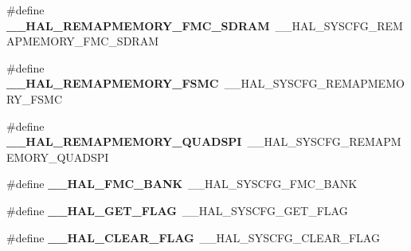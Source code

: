 \begin{DoxyCompactItemize}
\item 
\mbox{\label{group___h_a_l___aliased___macros_ga366da658d4d21e3b2192803ffc1a15f9}} 
\#define {\bfseries \+\_\+\+\_\+\+H\+A\+L\+\_\+\+R\+E\+M\+A\+P\+M\+E\+M\+O\+R\+Y\+\_\+\+F\+M\+C\+\_\+\+S\+D\+R\+AM}~\+\_\+\+\_\+\+H\+A\+L\+\_\+\+S\+Y\+S\+C\+F\+G\+\_\+\+R\+E\+M\+A\+P\+M\+E\+M\+O\+R\+Y\+\_\+\+F\+M\+C\+\_\+\+S\+D\+R\+AM
\item 
\mbox{\label{group___h_a_l___aliased___macros_gace8e26327633559ff2a31f3abfb0b43b}} 
\#define {\bfseries \+\_\+\+\_\+\+H\+A\+L\+\_\+\+R\+E\+M\+A\+P\+M\+E\+M\+O\+R\+Y\+\_\+\+F\+S\+MC}~\+\_\+\+\_\+\+H\+A\+L\+\_\+\+S\+Y\+S\+C\+F\+G\+\_\+\+R\+E\+M\+A\+P\+M\+E\+M\+O\+R\+Y\+\_\+\+F\+S\+MC
\item 
\mbox{\label{group___h_a_l___aliased___macros_gabec43ae4c792da49cd660bba7bf21133}} 
\#define {\bfseries \+\_\+\+\_\+\+H\+A\+L\+\_\+\+R\+E\+M\+A\+P\+M\+E\+M\+O\+R\+Y\+\_\+\+Q\+U\+A\+D\+S\+PI}~\+\_\+\+\_\+\+H\+A\+L\+\_\+\+S\+Y\+S\+C\+F\+G\+\_\+\+R\+E\+M\+A\+P\+M\+E\+M\+O\+R\+Y\+\_\+\+Q\+U\+A\+D\+S\+PI
\item 
\mbox{\label{group___h_a_l___aliased___macros_ga998ba343dd714de7bc84010ef1af5f89}} 
\#define {\bfseries \+\_\+\+\_\+\+H\+A\+L\+\_\+\+F\+M\+C\+\_\+\+B\+A\+NK}~\+\_\+\+\_\+\+H\+A\+L\+\_\+\+S\+Y\+S\+C\+F\+G\+\_\+\+F\+M\+C\+\_\+\+B\+A\+NK
\item 
\mbox{\label{group___h_a_l___aliased___macros_gabf8f11b57435bd1462f9a2137653c787}} 
\#define {\bfseries \+\_\+\+\_\+\+H\+A\+L\+\_\+\+G\+E\+T\+\_\+\+F\+L\+AG}~\+\_\+\+\_\+\+H\+A\+L\+\_\+\+S\+Y\+S\+C\+F\+G\+\_\+\+G\+E\+T\+\_\+\+F\+L\+AG
\item 
\mbox{\label{group___h_a_l___aliased___macros_ga5c6118ac714daf269dfcf8b0dc5740cf}} 
\#define {\bfseries \+\_\+\+\_\+\+H\+A\+L\+\_\+\+C\+L\+E\+A\+R\+\_\+\+F\+L\+AG}~\+\_\+\+\_\+\+H\+A\+L\+\_\+\+S\+Y\+S\+C\+F\+G\+\_\+\+C\+L\+E\+A\+R\+\_\+\+F\+L\+AG
\item 
\mbox{\label{group___h_a_l___aliased___macros_gac1dfd2bab2879b5106f1dc496e3c356c}} 

\end{DoxyCompactItemize}

